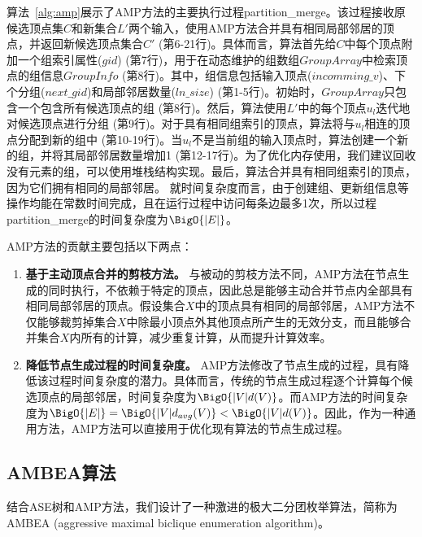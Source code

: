 算法~\ref{alg:amp}展示了AMP方法的主要执行过程\textsf{partition\_merge}。该过程接收原候选顶点集$C$和新集合$L'$两个输入，使用AMP方法合并具有相同局部邻居的顶点，并返回新候选顶点集合$C'$ (第6-21行)。具体而言，算法首先给$C$中每个顶点附加一个组索引属性($gid$) (第7行)，用于在动态维护的组数组$GroupArray$中检索顶点的组信息$GroupInfo$ (第8行)。其中，组信息包括输入顶点($incomming\_v$)、下个分组($next\_gid$)和局部邻居数量($ln\_size$) (第1-5行)。初始时，$GroupArray$只包含一个包含所有候选顶点的组 (第8行)。然后，算法使用$L'$中的每个顶点$u_l$迭代地对候选顶点进行分组 (第9行)。对于具有相同组索引的顶点，算法将与$u_l$相连的顶点分配到新的组中 (第10-19行)。当$u_l$不是当前组的输入顶点时，算法创建一个新的组，并将其局部邻居数量增加1 (第12-17行)。为了优化内存使用，我们建议回收没有元素的组，可以使用堆栈结构实现。最后，算法合并具有相同组索引的顶点，因为它们拥有相同的局部邻居。
就时间复杂度而言，由于创建组、更新组信息等操作均能在常数时间完成，且在运行过程中访问每条边最多1次，所以过程\textsf{partition\_merge}的时间复杂度为$\BigO{|E|}$。

AMP方法的贡献主要包括以下两点：

\begin{enumerate}
  \item \textbf{基于主动顶点合并的剪枝方法。} 与被动的剪枝方法不同，AMP方法在节点生成的同时执行，不依赖于特定的顶点，因此总是能够主动合并节点内全部具有相同局部邻居的顶点。假设集合$X$中的顶点具有相同的局部邻居，AMP方法不仅能够裁剪掉集合$X$中除最小顶点外其他顶点所产生的无效分支，而且能够合并集合$X$内所有的计算，减少重复计算，从而提升计算效率。
  
  \item \textbf{降低节点生成过程的时间复杂度。} AMP方法修改了节点生成的过程，具有降低该过程时间复杂度的潜力。具体而言，传统的节点生成过程逐个计算每个候选顶点的局部邻居，时间复杂度为$\BigO{|V|d(V)}$。而AMP方法的时间复杂度为$\BigO{|E|} =\BigO{|V|d_{avg}(V)} < \BigO{|V|d(V)}$。因此，作为一种通用方法，AMP方法可以直接用于优化现有算法的节点生成过程。

\end{enumerate}

\subsection{AMBEA算法}
\label{subsec:ambea}
  结合ASE树和AMP方法，我们设计了一种激进的极大二分团枚举算法，简称为AMBEA (aggressive maximal biclique enumeration algorithm)。


